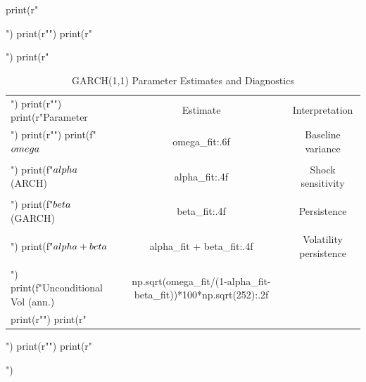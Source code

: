 \documentclass[11pt,a4paper]{article}
\begin{document}
{{\begin{pycode}
print(r"\begin{table}[H]")
print(r"\centering")
print(r"\caption{GARCH(1,1) Parameter Estimates and Diagnostics}")
print(r"\begin{tabular}{lcc}")
print(r"\toprule")
print(r"Parameter & Estimate & Interpretation \\")
print(r"\midrule")
print(f"$\\omega$ & {omega_fit:.6f} & Baseline variance \\\\")
print(f"$\\alpha$ (ARCH) & {alpha_fit:.4f} & Shock sensitivity \\\\")
print(f"$\\beta$ (GARCH) & {beta_fit:.4f} & Persistence \\\\")
print(f"$\\alpha + \\beta$ & {alpha_fit + beta_fit:.4f} & Volatility persistence \\\\")
print(f"Unconditional Vol (ann.) & {np.sqrt(omega_fit/(1-alpha_fit-beta_fit))*100*np.sqrt(252):.2f}\\%
print(r"\bottomrule")
print(r"\end{tabular}")
print(r"\label{tab:garch}")
print(r"\end{table}")
\end{pycode}

}}
\end{document}
